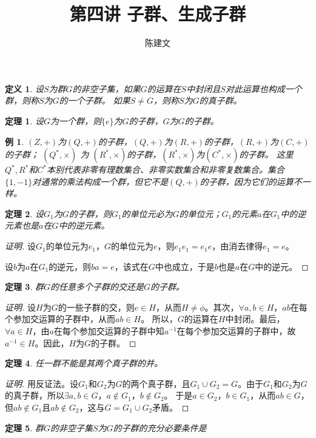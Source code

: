 \documentclass{article}
\newtheorem{Def}{定义}
\newtheorem{Thm}{定理}
\newtheorem*{Example}{例}
\begin{document}
\begin{CJK*}{UTF8}{gbsn}
  \title{第四讲 子群、生成子群}
  \author{陈建文}
  \maketitle
  \begin{Def}
    设$S$为群$G$的非空子集，如果$G$的运算在$S$中封闭且$S$对此运算也构成一个群，则称$S$为$G$的一个子群。
    如果$S\neq G$，则称$S$为$G$的真子群。
   \end{Def} 
  \begin{Thm}
  设$G$为一个群，则$\{e\}$为$G$的子群，$G$为$G$的子群。
  \end{Thm}
  \begin{Example}
    $(Z,+)$为$(Q,+)$的子群，$(Q,+)$为$(R,+)$的子群，$(R,+)$为$(C,+)$的子群；
    $(Q^*,\times)$ 为 $(R^*,\times)$的子群，$(R^*,\times)$为$(C^*,\times)$的子群。
    这里$Q^*,R^*$和$C^*$本别代表非零有理数集合、非零实数集合和非零复数集合。集合$\{1,-1\}$对通常的乘法构成一个群，但它不是$(Q,+)$的子群，因为它们的运算不一样。
  \end{Example}
  
   \begin{Thm}
    设$G_1$为$G$的子群，则$G_1$的单位元必为$G$的单位元；$G_1$的元素$a$在$G_1$中的逆元素也是$a$在$G$中的逆元素。
   \end{Thm}
  \begin{proof}[证明]
    设$G_1$的单位元为$e_1$，$G$的单位元为$e$，则$e_1e_1=e_1e$，由消去律得$e_1=e$。
  
    设$b$为$a$在$G_1$的逆元，则$ba=e$，该式在$G$中也成立，于是$b$也是$a$在$G$中的逆元。
  \end{proof}
   \begin{Thm}
    群$G$的任意多个子群的交还是$G$的子群。
   \end{Thm}
  \begin{proof}[证明]
    设$H$为$G$的一些子群的交，则$e\in H$，从而$H\neq \phi$。其次，$\forall a,b\in H$，$ab$在每个参加交运算的子群中，从而$ab\in H$。
    所以，$G$的运算在$H$中封闭。最后，$\forall a\in H$，由$a$在每个参加交运算的子群中知$a^{-1}$在每个参加交运算的子群中，故$a^{-1}\in H$。因此，$H$为$G$的子群。
  \end{proof}
   \begin{Thm}
    任一群不能是其两个真子群的并。
   \end{Thm}
  \begin{proof}[证明]
    用反证法。设$G_1$和$G_2$为$G$的两个真子群，且$G_1\cup G_2=G$。由于$G_1$和$G_2$为$G$的真子群，所以$\exists a,b\in G$，$a\notin G_1$，$b\notin G_2$。
    于是$a\in G_2$，$b\in G_1$，从而$ab\in G$，但$ab\notin G_1$且$ab\notin G_2$，这与$G=G_1\cup G_2$矛盾。
  \end{proof}
   \begin{Thm}
    群$G$的非空子集$S$为$G$的子群的充分必要条件是
  

\end{Thm}
\end{CJK*}
\end{document}
